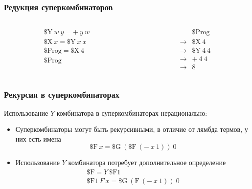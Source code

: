 \begin{frame}
    \frametitle{Редукция суперкомбинаторов}

    \begin{columns}
        \begin{column}{0.2\textwidth}
            \begin{gather*}
                \text{\${}Y}\ w\ y = +\ y\ w \\
                \text{\${}X}\ x = \text{\${}Y}\ x\ x \\
                \text{\${}Prog} = \text{\${}X}\ 4 \\
                \hline
                \text{\${}Prog}
            \end{gather*}
        \end{column}
        \begin{column}{0.2\textwidth}
            \begin{align*}
                              & \text{\${}Prog}    \\
                \rightarrow{} & \text{\${}X}\ 4    \\
                \rightarrow{} & \text{\${}Y}\ 4\ 4 \\
                \rightarrow{} & +\ 4\ 4            \\
                \rightarrow{} & 8
            \end{align*}
        \end{column}
    \end{columns}

\end{frame}

\begin{frame}
    \frametitle{Рекурсия в суперкомбинаторах}

    Использование $Y$ комбинатора в суперкомбинаторах нерационально:
    \begin{itemize}
        \item Суперкомбинаторы могут быть рекурсивными, в отличие от лямбда термов, у них есть имена
              \[\text{\${}F}\ x = \text{\${}G}\ (\text{\${}F}\ (-\ x\ 1))\ 0\]
        \item Использование $Y$ комбинатора потребует дополнительное определение
              \begin{gather*}
                  \text{\${}F} = Y\ \text{\${}F1} \\
                  \text{\${}F1}\ F\ x = \text{\${}G}\ (\text{F}\ (-\ x\ 1))\ 0
              \end{gather*}
    \end{itemize}

\end{frame}

